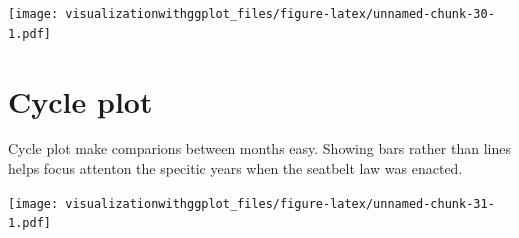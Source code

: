 \documentclass[]{krantz}
\makeatletter
\newenvironment{Shaded}{\begin{snugshade}}{\end{snugshade}}
\newcommand{\KeywordTok}[1]{\textcolor[rgb]{0.13,0.29,0.53}{\textbf{#1}}}
\newcommand{\DataTypeTok}[1]{\textcolor[rgb]{0.13,0.29,0.53}{#1}}
\newcommand{\DecValTok}[1]{\textcolor[rgb]{0.00,0.00,0.81}{#1}}
\newcommand{\FloatTok}[1]{\textcolor[rgb]{0.00,0.00,0.81}{#1}}
\newcommand{\StringTok}[1]{\textcolor[rgb]{0.31,0.60,0.02}{#1}}
\newcommand{\OperatorTok}[1]{\textcolor[rgb]{0.81,0.36,0.00}{\textbf{#1}}}
\newcommand{\NormalTok}[1]{#1}
\newenvironment{kframe}{%
\medskip{}
\setlength{\fboxsep}{.8em}
 \def\at@end@of@kframe{}%
 \ifinner\ifhmode%
  \def\at@end@of@kframe{\end{minipage}}%
  \begin{minipage}{\columnwidth}%
 \fi\fi%
 \def\FrameCommand##1{\hskip\@totalleftmargin \hskip-\fboxsep
 \colorbox{shadecolor}{##1}\hskip-\fboxsep
     \hskip-\linewidth \hskip-\@totalleftmargin \hskip\columnwidth}%
 \MakeFramed {\advance\hsize-\width
   \@totalleftmargin\z@ \linewidth\hsize
   \@setminipage}}%
 {\par\unskip\endMakeFramed%
 \at@end@of@kframe}
\renewenvironment{Shaded}{\begin{kframe}}{\end{kframe}}
\theoremstyle{definition}
\theoremstyle{definition}
\theoremstyle{definition}
\theoremstyle{remark}
\makeatother
\begin{document}
\texttt{[image: visualizationwithggplot\_files/figure-latex/unnamed-chunk-30-1.pdf]}

\section{Cycle plot}\label{cycle-plot}

Cycle plot make comparions between months easy. Showing bars rather than
lines helps focus attenton the specitic years when the seatbelt law was
enacted.

\begin{Shaded}
\end{Shaded}

\texttt{[image: visualizationwithggplot\_files/figure-latex/unnamed-chunk-31-1.pdf]}
\end{document}
